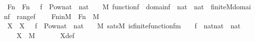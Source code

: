 \begin{isabellebody}
\ Fn\ \ {\isachardoublequoteopen}Fn\ {\isasymequiv}\ {\isacharbraceleft}{\kern0pt}\ f\ {\isasymin}\ Pow{\isacharparenleft}{\kern0pt}{\isacharparenleft}{\kern0pt}nat\ {\isasymtimes}\ nat{\isacharparenright}{\kern0pt}\ {\isasymtimes}\ {}{\isacharparenright}{\kern0pt}\ {\isasyminter}\ M{\isachardot}{\kern0pt}\ function{\isacharparenleft}{\kern0pt}f{\isacharparenright}{\kern0pt}\ {\isasymand}\ domain{\isacharparenleft}{\kern0pt}f{\isacharparenright}{\kern0pt}\ {\isasymsubseteq}\ nat\ {\isasymtimes}\ nat\ {\isasymand}\ finite{\isacharunderscore}{\kern0pt}M{\isacharparenleft}{\kern0pt}domain{\isacharparenleft}{\kern0pt}f{\isacharparenright}{\kern0pt}{\isacharparenright}{\kern0pt}\ {\isasymand}\ range{\isacharparenleft}{\kern0pt}f{\isacharparenright}{\kern0pt}\ {\isasymsubseteq}\ {}\ {\isacharbraceright}{\kern0pt}{\isachardoublequoteclose}\isanewline
\isanewline
{}\isamarkupfalse%
\ Fn{\isacharunderscore}{\kern0pt}in{\isacharunderscore}{\kern0pt}M\ {\isacharcolon}{\kern0pt}\ {\isachardoublequoteopen}Fn\ {\isasymin}\ M{\isachardoublequoteclose}\ \isanewline
%
\isadelimproof
%
\endisadelimproof
%
\isatagproof
{}\isamarkupfalse%
\ {\isacharminus}{\kern0pt}\ \isanewline
\isanewline
\ \ \isamarkupfalse%
\ X\ \ {\isachardoublequoteopen}X\ {\isasymequiv}\ {\isacharbraceleft}{\kern0pt}\ f\ {\isasymin}\ Pow{\isacharparenleft}{\kern0pt}{\isacharparenleft}{\kern0pt}nat\ {\isasymtimes}\ nat{\isacharparenright}{\kern0pt}\ {\isasymtimes}\ {}{\isacharparenright}{\kern0pt}\ {\isasyminter}\ M{\isachardot}{\kern0pt}\ sats{\isacharparenleft}{\kern0pt}M{\isacharcomma}{\kern0pt}\ is{\isacharunderscore}{\kern0pt}finite{\isacharunderscore}{\kern0pt}function{\isacharunderscore}{\kern0pt}fm{\isacharparenleft}{\kern0pt}{}{\isacharcomma}{\kern0pt}\ {}{\isacharcomma}{\kern0pt}\ {}{\isacharcomma}{\kern0pt}\ {}{\isacharparenright}{\kern0pt}{\isacharcomma}{\kern0pt}\ {\isacharbrackleft}{\kern0pt}f{\isacharbrackright}{\kern0pt}\ {\isacharat}{\kern0pt}\ {\isacharbrackleft}{\kern0pt}nat{\isasymtimes}nat{\isacharcomma}{\kern0pt}\ {}{\isacharcomma}{\kern0pt}\ nat{\isacharbrackright}{\kern0pt}{\isacharparenright}{\kern0pt}\ {\isacharbraceright}{\kern0pt}{\isachardoublequoteclose}\isanewline
\ \ \isamarkupfalse%
\ {\isachardoublequoteopen}X\ {\isasymin}\ M{\isachardoublequoteclose}\ \isanewline
\ \ \ \ \isamarkupfalse%
\ X{\isacharunderscore}{\kern0pt}def\isanewline
\ \ \ \ \isamarkupfalse%

\end{isabellebody}
